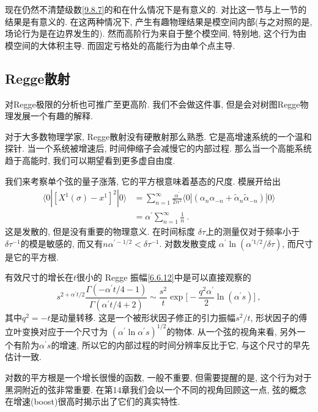 现在仍然不清楚级数\eqref{9.8.7}的和在什么情况下是有意义的. 对比这一节与上一节的结果是有意义的. 
在这两种情况下, 产生有趣物理结果是模空间内部(与之对照的是, 场论行为是在边界发生的). 
然而高阶行为来自于整个模空间, 特别地, 这个行为由模空间的大体积主导. 而固定亏格处的高能行为由单个点主导.

\subsection*{Regge散射}

对Regge极限的分析也可推广至更高阶. 我们不会做这件事, 但是会对树图Regge物理发展一个有趣的解释. 

对于大多数物理学家, Regge散射没有硬散射那么熟悉. 它是高增速系统的一个温和探针. 
当一个系统被增速后, 时间伸缩子会减慢它的内部过程. 那么当一个高能系统趋于高能时, 我们可以期望看到更多虚自由度.

我们来考察单个弦的量子涨落, 它的平方根意味着基态的尺度. 模展开给出
\begin{align}
	\langle 0 |[X^{1}(\sigma)-x^{1}]^{2}| 0\rangle &= \sum_{n=1}^{\infty} \frac{\alpha^{\prime}}{2 n^{2}}
	\langle 0|(\alpha_{n} \alpha_{-n} + \tilde{\alpha}_{n} \tilde{\alpha}_{-n})| 0\rangle  \nonumber \\
	&= \alpha^{\prime} \sum_{n=1}^{\infty} \frac{1}{n} \:. \label{9.8.9}
\end{align}
这是发散的, 但是没有重要的物理意义. 在时间标度 $\delta \tau$上的测量仅对于频率小于 $\delta \tau^{-1}$的模是敏感的, 
而又有$n \alpha^{\prime-1 / 2}<\delta \tau^{-1}$. 对数发散变成 $\alpha^{\prime} \ln(\alpha^{\prime 1/2} / \delta\tau)$, 而尺寸是它的平方根.

有效尺寸的增长在$t$很小的 Regge 振幅\eqref{6.6.12}中是可以直接观察的
\begin{equation}
	s^{2+\alpha^{\prime}t/2} \frac{\Gamma(-\alpha^{\prime} t/4 - 1)}{\Gamma(\alpha^{\prime} t/4 + 2)} \sim 
	\frac{s^{2}}{t} \exp \biggl[-\frac{q^{2} \alpha^{\prime}}{2} \ln (\alpha^{\prime} s)\biggr] \:, \label{9.8.10}
\end{equation}
其中$q^{2}=-t$是动量转移. 这是一个被形状因子修正的引力振幅$s^{2} / t$, 
形状因子的傅立叶变换对应于一个尺寸为 $(\alpha^{\prime} \ln \alpha^{\prime} s)^{1/2}$的物体. 
从一个弦的视角来看, 另外一个有阶为$\alpha^{\prime} s$的增速, 所以它的内部过程的时间分辨率反比于它, 与这个尺寸的早先估计一致.

对数的平方根是一个增长很慢的函数, 一般不重要, 但需要提醒的是, 这个行为对于黑洞附近的弦非常重要. 
在第14章我们会以一个不同的视角回顾这一点, 弦的概念在增速(boost)很高时揭示出了它们的真实特性.

